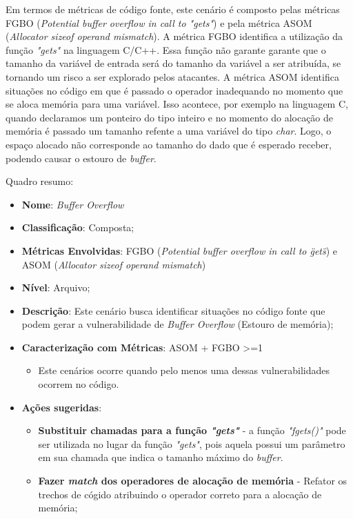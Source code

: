 Em termos de métricas de código fonte, este cenário é composto pelas métricas FGBO (\emph{Potential buffer overflow in call to "gets"}) e pela métrica ASOM (\emph{Allocator sizeof operand mismatch}). A métrica FGBO identifica a utilização da função \emph{"gets"} na linguagem C/C++. Essa função não garante garante que o tamanho da variável de entrada será do tamanho da variável a ser atribuída, se tornando um risco a ser explorado pelos atacantes. A métrica ASOM identifica situações no código em que é passado o operador inadequando no momento que se aloca memória para uma variável. Isso acontece, por exemplo na linguagem C, quando declaramos um ponteiro do tipo inteiro e no momento do alocação de memória é passado um tamanho refente a uma variável do tipo \emph{char}. Logo, o espaço alocado não corresponde ao tamanho do dado que é esperado receber, podendo causar o estouro de \emph{buffer}.

Quadro resumo:

\begin{itemize}
\item \textbf{Nome}: \emph{Buffer Overflow}
\item \textbf{Classificação}: Composta;
\item \textbf{Métricas Envolvidas}: FGBO (\emph{Potential buffer overflow in call to \"gets\"}) e ASOM (\emph{Allocator sizeof operand mismatch})
\item \textbf{Nível}: Arquivo;
\item \textbf{Descrição}: Este cenário busca identificar situações no código fonte que podem gerar a vulnerabilidade de \emph{Buffer Overflow} (Estouro de memória);
\item \textbf{Caracterização com Métricas}: ASOM + FGBO >=1
	\begin{itemize}
	\item Este cenários ocorre quando pelo menos uma dessas vulnerabilidades ocorrem no código.
	\end{itemize}
\item \textbf{Ações sugeridas}: 
	\begin{itemize}
	\item \textbf{Substituir chamadas para a função \emph{"gets"}} - a função \emph{"fgets()"} pode ser utilizada no lugar da função  \emph{"gets"}, pois aquela possui um parâmetro em sua chamada que indica o tamanho máximo do \emph{buffer}.  
	\item \textbf{Fazer \emph{match} dos operadores de alocação de memória} - Refator os trechos de cógido atribuindo o operador correto para a alocação de memória; 
	\end{itemize}
\end{itemize}

